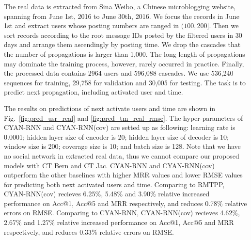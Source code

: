 The real data is extracted from Sina Weibo, a Chinese microblogging website,
spanning from June 1st, 2016 to June 30th, 2016. We focus the records in June
1st and extract users whose posting numbers are ranged in $(100,
200]$. Then we sort records according to the root
message IDs posted by the filtered users in 30 days and arrange them ascendingly
by posting time. We drop the cascades that the number of propagations is larger
than 1,000. The long length of propagations may dominate the training process,
however, rarely occurred in practice. 
Finally, the processed data contains 2964 users and 596,088 cascades. 
We use 536,240 sequences for training, 29,758 for validation and 30,005 for
testing. The task is to predict next propagation, including activated user and
time. 

The results on predictions of next
activate users and time are shown in Fig.~\ref{fig:pred_usr_real} and
\ref{fig:pred_tm_real_rmse}. The hyper-parameters of CYAN-RNN and CYAN-RNN(cov)
are setted up as following: learning rate is 0.0001; hidden layer size of
encoder is 20; hidden layer size of decoder is 10; window size is 200; coverage
size is 10; and batch size is 128. Note that we have no social
network in extracted real data, thus we cannot compare our proposed models with
CT Bern and CT Jac. CYAN-RNN and CYAN-RNN(cov) outperform the other baselines
with higher MRR values and lower RMSE values for predicting both next activated
users and time. Comparing to RMTPP, CYAN-RNN(cov) recieves 6.25\%, 5.48\% and
3.90\% relative increased performance on Acc@1, Acc@5 and MRR respectively, and
reduces 0.78\% relative errors on RMSE. Comparing to CYAN-RNN, CYAN-RNN(cov)
recieves 4.62\%, 2.67\% and 1.27\% relative increased performance on Acc@1,
Acc@5 and MRR respectively, and reduces 0.33\% relative errors on RMSE.



